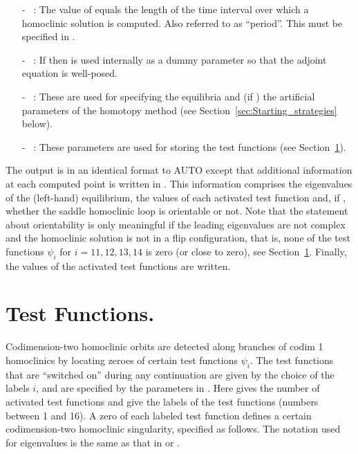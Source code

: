 \documentclass[12pt]{report}
\begin{document}
\begin{itemize}

\item[-] ~: 
The value of  equals the length of the time interval over
which a homoclinic solution is computed. Also referred to as ``period''.
This must be specified in .

\item[-] ~: 
If  then  is used internally as a
dummy parameter so that the adjoint equation is well-posed.

\item[-] ~:
These are used for specifying the 
equilibria and (if ) the artificial parameters of
the homotopy method (see Section~\ref{sec:Starting_strategies} below).

\item[-] ~: 
These parameters are used for storing the test functions 
(see Section~\ref{sec:HomCont_Test_functions}).
\end{itemize}

The output is in an identical format to {\cal AUTO} except that
additional information at each computed point is written 
in . This information comprises the eigenvalues of
the (left-hand) equilibrium, the values of each activated test
function and, if , 
whether the saddle homoclinic loop is orientable
or not.
Note that the statement about orientability is only meaningful if the
leading eigenvalues are not complex and the homoclinic solution is not
in a flip configuration, that is, none of the test functions 
$\psi_i$ for $i=11,12,13,14$ is zero (or close to zero), 
see Section~\ref{sec:HomCont_Test_functions}.
 Finally, the values of the  activated test functions are written. 

\section{ Test Functions.} \label{sec:HomCont_Test_functions}
Codimension-two homoclinic orbits are detected along branches of codim
1 homoclinics by locating zeroes of certain test functions
$\psi_i$. The test functions that are ``switched on'' during any
continuation are given by the choice of the labels $i$, and are
specified by the parameters  in .  Here  gives the number of activated test functions
and  give the labels of
the test functions (numbers between 1 and 16). A zero of
each labeled test function defines a certain codimension-two 
homoclinic singularity, specified as follows.
The notation used for eigenvalues is the same as that in
 or . 
\end{document}
